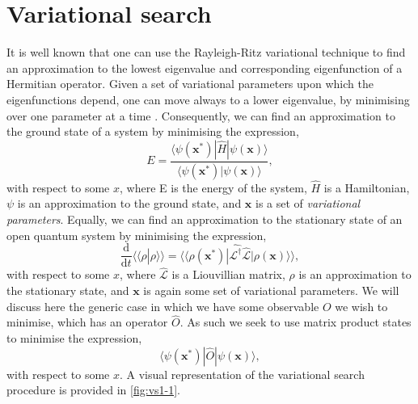  \section{Variational search}
 It is well known that one can use the Rayleigh-Ritz variational technique to find an approximation to the lowest eigenvalue and corresponding eigenfunction of a Hermitian operator. Given a set of variational parameters upon which the eigenfunctions depend, one can move always to a lower eigenvalue, by minimising over one parameter at a time \cite{ArfWeb_RRVT,Gasiorowicz_RVT}. Consequently, we can find an approximation to the ground state of a system by minimising the expression,
\begin{equation}
E = \frac{\langle \psi (\mathbf{x}^{*}) | \hat{H} | \psi (\mathbf{x}) \rangle}{\langle \psi (\mathbf{x}^{*}) | \psi (\mathbf{x}) \rangle},
\label{eq:vs1-1}
\end{equation}
with respect to some \(x\), where E is the energy of the system, \(\hat{H}\) is a Hamiltonian, \(\psi\) is an approximation to the ground state, and \( \mathbf{x} \) is a set of \emph{variational parameters}. Equally, we can find an approximation to the stationary state of an open quantum system by minimising the expression,
\begin{equation}
\frac{\mathrm{d}}{\mathrm{d}t}\langle \langle \rho|\rho \rangle \rangle = \langle \langle \rho(\mathbf{x}^{*}) | \hat{\mathcal{L}^{\dagger}} \hat{\mathcal{L}} | \rho(\mathbf{x}) \rangle \rangle,
\label{eq:vs1-2}
\end{equation}
with respect to some \(x\), where \(\hat{\mathcal{L}}\) is a Liouvillian matrix, \(\rho\) is an approximation to the stationary state, and \(\mathbf{x}\) is again some set of variational parameters. We will discuss here the generic case in which we have some observable \(O\) we wish to minimise, which has an operator \(\hat{O}\). As such we seek to use matrix product states to minimise the expression,
\begin{equation}
\langle \psi(\mathbf{x}^{*}) | \hat{O} | \psi(\mathbf{x}) \rangle,
\label{eq:vs1-10}
\end{equation}
with respect to some \(x\). A visual representation of the variational search procedure is provided in \cref{fig:vs1-1}.

